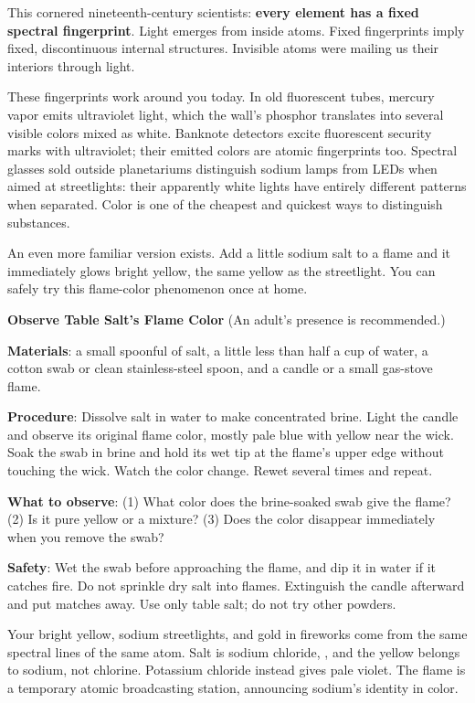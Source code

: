 This cornered nineteenth-century scientists: \textbf{every element has a fixed spectral fingerprint}. Light emerges from inside atoms. Fixed fingerprints imply fixed, discontinuous internal structures. Invisible atoms were mailing us their interiors through light.

These fingerprints work around you today. In old fluorescent tubes, mercury vapor emits ultraviolet light, which the wall's phosphor translates into several visible colors mixed as white. Banknote detectors excite fluorescent security marks with ultraviolet; their emitted colors are atomic fingerprints too. Spectral glasses sold outside planetariums distinguish sodium lamps from LEDs when aimed at streetlights: their apparently white lights have entirely different patterns when separated. Color is one of the cheapest and quickest ways to distinguish substances.

An even more familiar version exists. Add a little sodium salt to a flame and it immediately glows bright yellow, the same yellow as the streetlight. You can safely try this flame-color phenomenon once at home.

\begin{shiyan}
\textbf{Observe Table Salt's Flame Color} (An adult's presence is recommended.)

\textbf{Materials}: a small spoonful of salt, a little less than half a cup of water, a cotton swab or clean stainless-steel spoon, and a candle or a small gas-stove flame.

\textbf{Procedure}: Dissolve salt in water to make concentrated brine. Light the candle and observe its original flame color, mostly pale blue with yellow near the wick. Soak the swab in brine and hold its wet tip at the flame's upper edge without touching the wick. Watch the color change. Rewet several times and repeat.

\textbf{What to observe}: (1) What color does the brine-soaked swab give the flame? (2) Is it pure yellow or a mixture? (3) Does the color disappear immediately when you remove the swab?

\textbf{Safety}: Wet the swab before approaching the flame, and dip it in water if it catches fire. Do not sprinkle dry salt into flames. Extinguish the candle afterward and put matches away. Use only table salt; do not try other powders.

Your bright yellow, sodium streetlights, and gold in fireworks come from the same spectral lines of the same atom. Salt is sodium chloride, , and the yellow belongs to sodium, not chlorine. Potassium chloride instead gives pale violet. The flame is a temporary atomic broadcasting station, announcing sodium's identity in color.
\end{shiyan}

